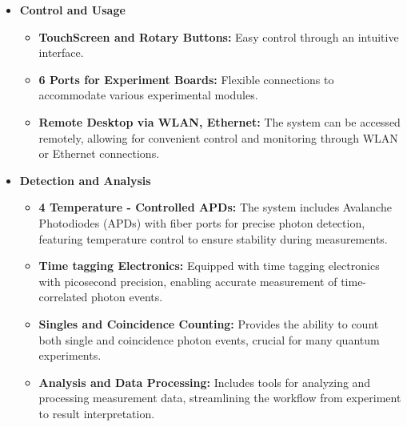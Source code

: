 \begin{itemize}
\begin{itemize}
		 \item [$\rightarrow$] \textbf{Optically Detected Magnetic Resonance(ODMR): }
		 It also supports \acs{ODMR} experiments, which are essential for studying the properties of quantum systems under different magnetic fields.
		 
	\end{itemize}
	
	\item \textbf{Control and Usage}
	\begin{itemize}
		\item [$\rightarrow$] \textbf{TouchScreen and Rotary Buttons: }
		Easy control through an intuitive interface.
		
		\item [$\rightarrow$] \textbf{6 Ports for Experiment Boards: }
		Flexible connections to accommodate various experimental modules.
		
		\item [$\rightarrow$] \textbf{Remote Desktop via WLAN, Ethernet: }
		The system can be accessed remotely, allowing for convenient control and monitoring through WLAN or Ethernet connections.
		
	\end{itemize}
	
	\item \textbf{Detection and Analysis}
	\begin{itemize}
		\item [$\rightarrow$] \textbf{4 Temperature - Controlled APDs: }
		The system includes Avalanche Photodiodes (APDs) with fiber ports for precise photon detection, featuring temperature control to ensure stability during measurements.
		
		\item [$\rightarrow$] \textbf{Time tagging Electronics: }
		Equipped with time tagging electronics with picosecond precision, enabling accurate measurement of time-correlated photon events.
		
		\item[$\rightarrow$] \textbf{Singles and Coincidence Counting: }
		 Provides the ability to count both single and coincidence photon events, crucial for many quantum experiments.
		 
		 \item[$\rightarrow$] \textbf{Analysis and Data Processing: }
		  Includes tools for analyzing and processing measurement data, streamlining the workflow from experiment to result interpretation.
	
	\end{itemize}
\end{itemize}

